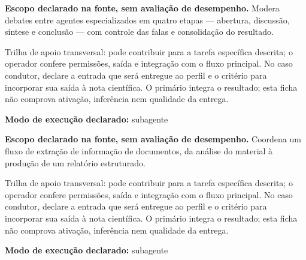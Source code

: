 \begin{descricao}
\textbf{Escopo declarado na fonte, sem avaliação de desempenho.}
Modera debates entre agentes especializados em quatro etapas — abertura, discussão, síntese e conclusão — com controle das falas e consolidação do resultado.
\end{descricao}

\begin{funcao}
Trilha de apoio transversal: pode contribuir para a tarefa específica descrita; o operador confere permissões, saída e integração com o fluxo principal. No caso condutor, declare a entrada que será entregue ao perfil e o critério para incorporar sua saída à nota científica. O primário integra o resultado; esta ficha não comprova ativação, inferência nem qualidade da entrega.
\end{funcao}

\begin{arquitetura}
\textbf{Modo de execução declarado:} subagente
\end{arquitetura}


\begin{descricao}
\textbf{Escopo declarado na fonte, sem avaliação de desempenho.}
Coordena um fluxo de extração de informação de documentos, da análise do material à produção de um relatório estruturado.
\end{descricao}

\begin{funcao}
Trilha de apoio transversal: pode contribuir para a tarefa específica descrita; o operador confere permissões, saída e integração com o fluxo principal. No caso condutor, declare a entrada que será entregue ao perfil e o critério para incorporar sua saída à nota científica. O primário integra o resultado; esta ficha não comprova ativação, inferência nem qualidade da entrega.
\end{funcao}

\begin{arquitetura}
\textbf{Modo de execução declarado:} subagente
\end{arquitetura}


